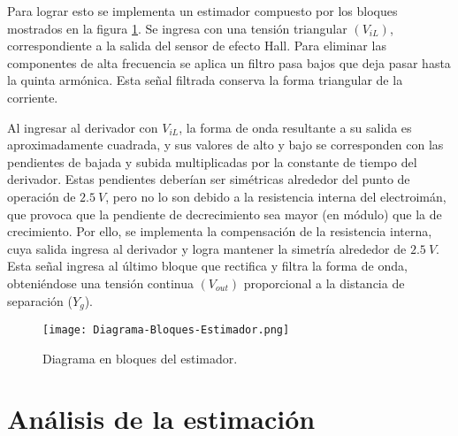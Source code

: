 

\noindent Para lograr esto se implementa un estimador compuesto por los bloques mostrados en la figura \ref{fig:img_Diagrama-Bloques-Estimador.png}. Se ingresa con una tensión triangular $(V_{iL})$, correspondiente a la salida del sensor de efecto Hall. Para eliminar las componentes de alta frecuencia se aplica un filtro pasa bajos que deja pasar hasta la quinta armónica. Esta señal filtrada conserva la forma triangular de la corriente. 

\noindent Al ingresar al derivador con $V_{iL}$, la forma de onda resultante a su salida es aproximadamente cuadrada, y sus valores de alto y bajo se corresponden con las pendientes de bajada y subida multiplicadas por la constante de tiempo del derivador. Estas pendientes deberían ser simétricas alrededor del punto de operación de $2.5\:V$, pero no lo son debido a la resistencia interna del electroimán, que provoca que la pendiente de decrecimiento sea mayor (en módulo) que la de crecimiento. Por ello, se implementa la compensación de la resistencia interna, cuya salida ingresa al derivador y logra mantener la simetría alrededor de $2.5\:V$. Esta señal ingresa al último bloque que rectifica y filtra la forma de onda, obteniéndose una tensión continua $(V_{out})$ proporcional a la distancia de separación ($Y_{g}$).

\begin{figure}[H]
	\centering
	\texttt{[image: Diagrama-Bloques-Estimador.png]}
	\caption{Diagrama en bloques del estimador.}
	\label{fig:img_Diagrama-Bloques-Estimador.png}
\end{figure}

\section{An\'{a}lisis de la estimaci\'{o}n}

